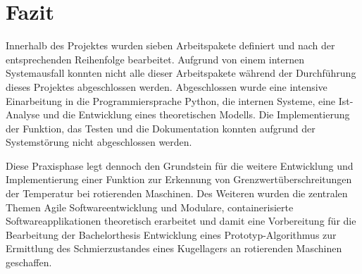 \chapter{Fazit}
Innerhalb des Projektes wurden sieben Arbeitspakete definiert und nach der entsprechenden 
Reihenfolge bearbeitet. Aufgrund von einem internen Systemausfall konnten nicht alle dieser 
Arbeitspakete während der Durchführung dieses Projektes abgeschlossen werden. 
Abgeschlossen wurde eine intensive Einarbeitung in die Programmiersprache Python, die 
internen Systeme, eine Ist-Analyse und die Entwicklung eines theoretischen Modells. 
Die Implementierung der Funktion, das Testen und die Dokumentation konnten aufgrund der 
Systemstörung nicht abgeschlossen werden. 

Diese Praxisphase legt dennoch den Grundstein für die weitere Entwicklung und Implementierung
einer Funktion zur Erkennung von Grenzwertüberschreitungen der Temperatur bei rotierenden 
Maschinen. Des Weiteren wurden die zentralen Themen \glqq Agile Softwareentwicklung\grqq{} und 
\glqq Modulare, containerisierte Softwareapplikationen\grqq{} theoretisch erarbeitet und damit 
eine Vorbereitung für die Bearbeitung der Bachelorthesis  \glqq Entwicklung eines 
Prototyp-Algorithmus zur Ermittlung des Schmierzustandes eines Kugellagers an rotierenden 
Maschinen\grqq{} geschaffen. 



